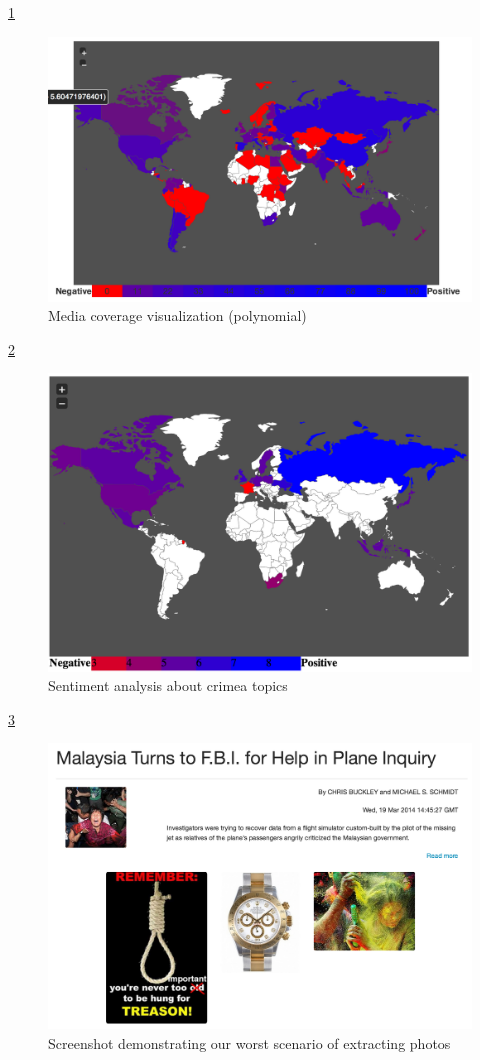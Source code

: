 \documentclass{acm_proc_10ptArticle-sp}
\begin{document}
\ref{screenshot:coverage}
\begin{figure}[H]
  \centering
  \includegraphics[width=0.9\linewidth]{img/media-coverage-polynomial.png}
  \caption{Media coverage visualization (polynomial)}
  \label{screenshot:coverage}
\end{figure}

\ref{screenshot:crimea}
\begin{figure}[H]
  \centering
  \includegraphics[width=0.9\linewidth]{img/crimea.png}
  \caption{Sentiment analysis about crimea topics}
  \label{screenshot:crimea}
\end{figure}

\ref{screenshot:limitation}
\begin{figure}[H]
  \centering
  \includegraphics[width=0.9\linewidth]{img/limitation-ZK.png}
  \caption{Screenshot demonstrating our worst scenario of extracting photos}
  \label{screenshot:limitation}
\end{figure}
\end{document}
